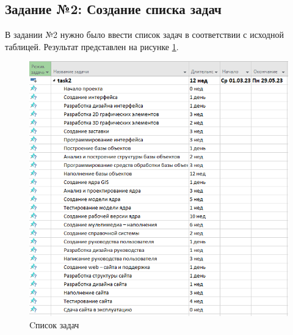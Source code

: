 \newpage
\subsection*{Задание №2: Создание списка задач}
В задании №2 нужно было ввести список задач в соответствии с исходной таблицей. Результат представлен на рисунке \ref{p6}.
\begin{figure}[!h]
	\centering
	\includegraphics[width=1\linewidth]{inc/img/6.png}
	\caption{Cписок задач}
	\label{p6}
\end{figure}

\newpage
